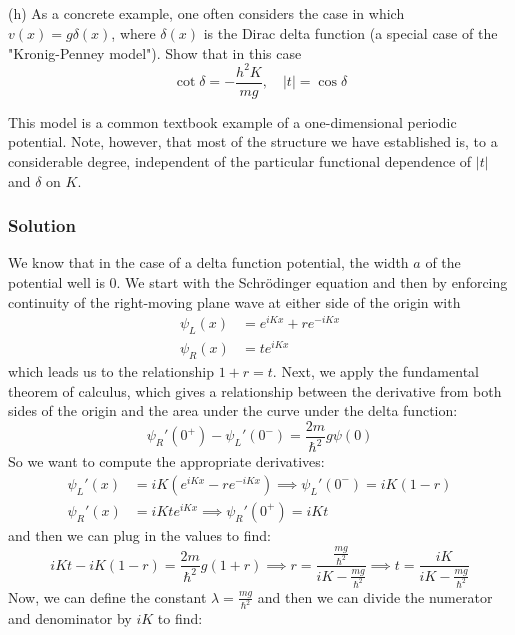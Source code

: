 \documentclass[12pt]{article}
\begin{document}
\subsection{}

(h) As a concrete example, one often considers the case in which \( v(x) = g \delta(x) \), where \( \delta(x) \) is the Dirac delta function (a special case of the "Kronig-Penney model"). Show that in this case
$$
\cot \delta = -\frac{h^2 K}{m g}, \quad |t| = \cos \delta
$$

This model is a common textbook example of a one-dimensional periodic potential. Note, however, that most of the structure we have established is, to a considerable degree, independent of the particular functional dependence of \( |t| \) and \( \delta \) on \( K \).

\subsubsection{Solution}
We know that in the case of a delta function potential, the width \( a \) of the potential well is 0. 
We start with the Schrödinger equation and then by enforcing continuity of the right-moving plane wave at either side of the origin with
\begin{align}
    \psi_L(x) &= e^{iKx} + re^{-iKx} \\
    \psi_R(x) &= te^{iKx}
\end{align}
which leads us to the relationship \( 1 + r = t \).
Next, we apply the fundamental theorem of calculus, which gives a relationship between the derivative from both sides of the origin and the area under the curve under the delta function:
\begin{equation}
    \psi_R'(0^+) - \psi_L'(0^-) = \frac{2m}{\hbar^2}g\psi(0)
\end{equation}
So we want to compute the appropriate derivatives:
\begin{align}
    \psi_L'(x) &= iK\left(e^{iKx} - re^{-iKx}\right) \implies \psi_L'(0^-) = iK(1 - r) \\
    \psi_R'(x) &= iKt e^{iKx} \implies \psi_R'(0^+) = iKt
\end{align}
and then we can plug in the values to find:
\begin{equation}
    iKt - iK(1 - r) = \frac{2m}{\hbar^2}g(1 + r) \implies r = \frac{\frac{mg}{\hbar^{2}}}{iK - \frac{mg}{\hbar^2}} \implies t = \frac{iK}{iK - \frac{mg}{\hbar^2}}
\end{equation}
Now, we can define the constant \( \lambda = \frac{mg}{\hbar^2} \) and then we can divide the numerator and denominator by \( iK \) to find:
\end{document}
